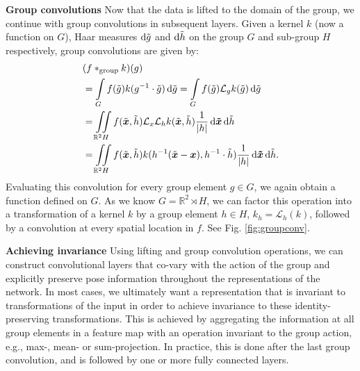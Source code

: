 \documentclass[nohyperref]{article}
\theoremstyle{plain}
\theoremstyle{definition}
\theoremstyle{remark}
\newcommand{\R}{\mathbb{R}}
\begin{document}
\textbf{Group convolutions}
Now that the data is lifted to the domain of the group, we continue with group convolutions in subsequent layers. Given a kernel $k$ (now a function on $G$), Haar measures ${\rm d}\tilde{g}$ and ${\rm d}\tilde{h}$ on the group $G$ and sub-group $H$ respectively, group convolutions are given by:
\begin{align}
\label{eq:groupconv}
    &(f *_{\mathrm{group}} k) (g) \\ &=\int\limits_G f(\tilde{g})k(g^{-1} \cdot \tilde{g})\,{\rm d}\tilde{g} 
    = \int\limits_G f(\tilde{g})\mathcal{L}_g k( \tilde{g})\,{\rm d}\tilde{g} \nonumber\\
    &=\iint\limits_{\R^2 H} f(\tilde{\boldsymbol{x}}, \tilde{h})\mathcal{L}_{x}\mathcal{L}_{h}k(\tilde{\boldsymbol{x}}, \tilde{h})\dfrac{1}{|h|} \,{\rm d}\boldsymbol{\tilde{x}}\,{\rm d}\tilde{h}\nonumber\\
    &=\iint\limits_{\R^2 H} f(\tilde{\boldsymbol{x}},\tilde{h})k({h^{-1}}(\tilde{\boldsymbol{x}}-\boldsymbol{x}), h^{-1}\cdot \tilde{h})\dfrac{1}{|h|} \,{\rm d}\boldsymbol{\tilde{x}}\,{\rm d}\tilde{h}.
\end{align}
Evaluating this convolution for every group element $g\in G$, we again obtain a function defined on $G$. As we know $G{=}\mathbb{R}^2 \rtimes H$, we can factor this operation into a transformation of a kernel $k$ by a group element $h \in H$, $k_h {=} \mathcal{L}_h(k)$, followed by a convolution at every spatial location in $f$. See Fig. \ref{fig:groupconv}.

\textbf{Achieving invariance} Using lifting and group convolution operations, we can construct convolutional layers that co-vary with the action of the group and explicitly preserve pose information throughout the representations of the network. In most cases, we ultimately want a representation that is invariant to transformations of the input in order to achieve invariance to these identity-preserving transformations. This is achieved by aggregating the information at all group elements in a feature map with an operation invariant to the group action, e.g., max-, mean- or sum-projection. In practice, this is done after the last group convolution, and is followed by one or more fully connected layers.
\end{document}
